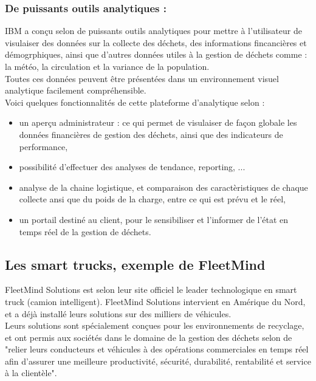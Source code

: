 \documentclass[a4paper,12pt]{report}
\begin{document}
\subsubsection*{De puissants outils analytiques : }
IBM a conçu selon \cite{ref24} de puissants outils analytiques pour mettre à l'utilisateur de visulaiser des données sur la collecte des déchets, des informations fincancières et démogrphiques, ainsi que d'autres données utiles à la gestion de déchets comme : la météo, la circulation et la variance de la population.\\
Toutes ces données peuvent être présentées dans un environnement visuel analytique facilement compréhensible.\\
Voici quelques fonctionnalités de cette plateforme d'analytique selon \cite{ref24} :
\begin{itemize}
\item un aperçu administrateur : ce qui permet de visulaiser de façon globale les données financières de gestion des déchets, ainsi que des indicateurs de performance,
\item possibilité d'effectuer des analyses de tendance, reporting, ...
\item analyse de la chaine logistique, et comparaison des caractèristiques de chaque collecte ansi que du poids de la charge, entre ce qui est prévu et le réel,
\item un portail destiné au client, pour le sensibiliser et l'informer de l'état en temps réel de la gestion de déchets.
\end{itemize}

\subsection{Les smart trucks, exemple de FleetMind}
FleetMind Solutions est selon leur site officiel \cite{ref22} le leader technologique en smart truck (camion intelligent). FleetMind Solutions intervient en Amérique du Nord, et a déjà installé leurs solutions sur des milliers de véhicules.\\
Leurs solutions sont spécialement conçues pour les environnements de recyclage, et ont permis aux sociétés dans le domaine de la gestion des déchets selon \cite{ref22} de "relier leurs conducteurs et véhicules à des opérations commerciales en temps réel afin d'assurer une meilleure productivité, sécurité, durabilité, rentabilité et service à la clientèle".
\end{document}
